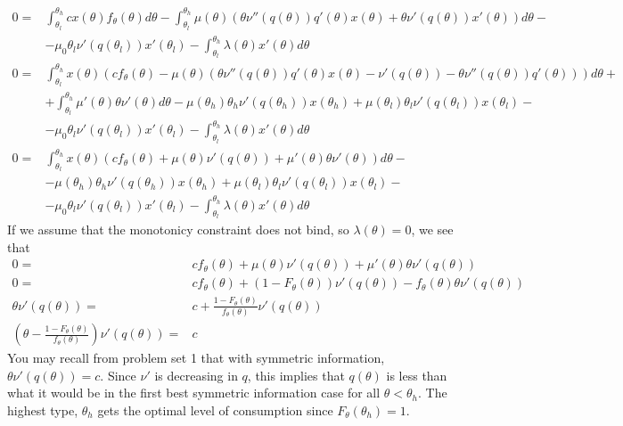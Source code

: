 \begin{align*}
  0 = & \int_{\theta_l}^{\theta_h} c x(\theta) f_\theta(\theta)
  d\theta - \int_{\theta_l}^{\theta_h} \mu(\theta)
  \left( \theta \nu''(q(\theta))q'(\theta) x(\theta) + \theta
    \nu'(q(\theta)) x'(\theta) \right)d\theta - \\
  & - \mu_0 \theta_l
  \nu'(q(\theta_l))x'(\theta_l) - \int_{\theta_l}^{\theta_h}
  \lambda(\theta) x'(\theta) d\theta \\
  0 = & \int_{\theta_l}^{\theta_h} x(\theta)\left( c f_\theta(\theta)
    - \mu(\theta) \left( \theta \nu''(q(\theta))q'(\theta) x(\theta) -
      \nu'(q(\theta)) - \theta \nu''(q(\theta))q'(\theta) \right) \right)
  d\theta + \\
  & + \int_{\theta_l}^{\theta_h} 
  \mu'(\theta) \theta \nu'(\theta) d\theta 
  - \mu(\theta_h)\theta_h \nu'(q(\theta_h))x(\theta_h) +
  \mu(\theta_l)\theta_l \nu'(q(\theta_l))x(\theta_l) - \\
  & - \mu_0 \theta_l \nu'(q(\theta_l))x'(\theta_l) 
  - \int_{\theta_l}^{\theta_h} \lambda(\theta) x'(\theta) d\theta \\
  0 = & \int_{\theta_l}^{\theta_h} x(\theta)\left( c f_\theta(\theta)
    + \mu(\theta) \nu'(q(\theta)) + 
    \mu'(\theta) \theta \nu'(\theta)\right) d\theta  - \\
    & - \mu(\theta_h)\theta_h \nu'(q(\theta_h))x(\theta_h) +
    \mu(\theta_l)\theta_l \nu'(q(\theta_l))x(\theta_l) - \\
    & - \mu_0 \theta_l \nu'(q(\theta_l))x'(\theta_l) 
    - \int_{\theta_l}^{\theta_h} \lambda(\theta) x'(\theta) d\theta 
\end{align*}
If we assume that the monotonicy constraint does not bind, so
$\lambda(\theta) = 0$, we see that
\begin{align*}
  0 = &c f_\theta(\theta) + \mu(\theta) \nu'(q(\theta)) + \mu'(\theta)
   \theta \nu'(q(\theta))  \\
   0 = & cf_\theta(\theta) + (1-F_\theta(\theta)) \nu'(q(\theta)) -
   f_{\theta}(\theta) \theta \nu'(q(\theta)) \\
   \theta \nu'(q(\theta)) = & c +
   \frac{1-F_\theta(\theta)}{f_\theta(\theta)} \nu'(q(\theta)) \\
   \left(\theta - \frac{1-F_\theta(\theta)}{f_\theta(\theta)}
   \right)\nu'(q(\theta)) = & c 
 \end{align*}
You may recall from problem set 1 that with symmetric information,
$\theta \nu'(q(\theta)) = c$. Since $\nu'$ is decreasing in $q$, this
implies that $q(\theta)$ is less than what it would be in the first
best symmetric information case for all $\theta < \theta_h$. The
highest type, $\theta_h$ gets the optimal level of consumption since
$F_\theta(\theta_h) = 1$. 
 




\clearpage




